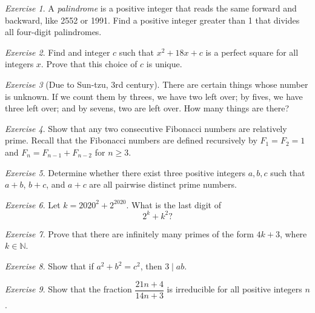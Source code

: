 \documentclass{article}
\theoremstyle{definition}
\theoremstyle{remark}
\newtheorem{exercise}{Exercise}
\newcommand{\NN}{\mathbb{N}}
\begin{document}
    \begin{exercise}
        A \textit{palindrome} is a positive integer that reads the same forward and backward, like 2552 or 1991. 
        Find a positive integer greater than 1 that divides all four-digit palindromes.
    \end{exercise}

    \begin{exercise}
        Find and integer \(c\) such that \(x^2+18x+c\) is a perfect square for all integers \(x\). 
        Prove that this choice of \(c\) is unique. 
    \end{exercise}

    \begin{exercise}[Due to Sun-tzu, 3rd century]
        There are certain things whose number is unknown. 
        If we count them by threes, we have two left over; by fives, we have three left over; and by sevens, two are left over. 
        How many things are there?
    \end{exercise}

    \begin{exercise}
        Show that any two consecutive Fibonacci numbers are relatively prime. 
        Recall that the Fibonacci numbers are defined recursively by \(F_1=F_2=1\) and \(F_n=F_{n-1}+F_{n-2}\) for \(n\geq 3\).
    \end{exercise}

    \begin{exercise}
        Determine whether there exist three positive integers \(a,b,c\) such that \(a+b\), \(b+c\), and \(a+c\) are all pairwise distinct prime numbers.
    \end{exercise}

    \begin{exercise}
        Let \(k=2020^2+2^{2020}\).
        What is the last digit of
        \[2^k+k^2\mathord{?}\]
    \end{exercise}

    \begin{exercise}
        Prove that there are infinitely many primes of the form \(4k+3\), where \(k\in\NN\).
    \end{exercise}

    \begin{exercise}
        Show that if \(a^2+b^2=c^2\), then \(3\mid ab\).
    \end{exercise}

    \begin{exercise}
        Show that the fraction \(\dfrac{21n+4}{14n+3}\) is irreducible for all positive integers \(n\).
    \end{exercise}
\end{document}
